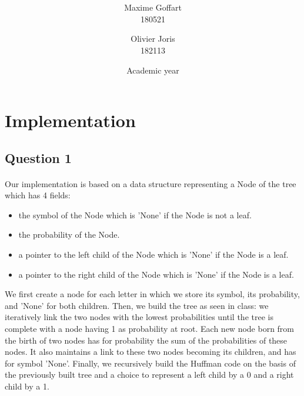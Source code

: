 \documentclass[a4paper, 11pt, oneside]{article}
\title{\ClassName\\\vspace*{0.8cm}\ProjectName\vspace{1cm}}
\author{Maxime Goffart \\180521 \and Olivier Joris\\182113}
\date{\vspace{1cm}Academic year \AcademicYear}
\begin{document}
\begin{titlingpage}
{\let\newpage\relax\maketitle}
\end{titlingpage}

\thispagestyle{empty}
\newpage




\section{Implementation}

\subsection{Question 1}
\paragraph{}Our implementation is based on a data structure representing a Node of the tree which has 4 fields: 
\begin{itemize}
\item the symbol of the Node which is 'None' if the Node is not a leaf.
\item the probability of the Node.
\item a pointer to the left child of the Node which is 'None' if the Node is a leaf.
\item a pointer to the right child of the Node which is 'None' if the Node is a leaf.
\end{itemize}

We first create a node for each letter in which we store its symbol, its probability, and 'None' for both children.
Then, we build the tree as seen in class: we iteratively link the two nodes with the lowest probabilities until the tree is complete with a node having 1 as probability at root. Each new node born from the birth of two nodes has for probability the sum of the probabilities of these nodes. It also maintains a link to these two nodes becoming its children, and has for symbol 'None'.
Finally, we recursively build the Huffman code on the basis of the previously built tree and a choice to represent a left child by a 0 and a right child by a 1.
\end{document}
